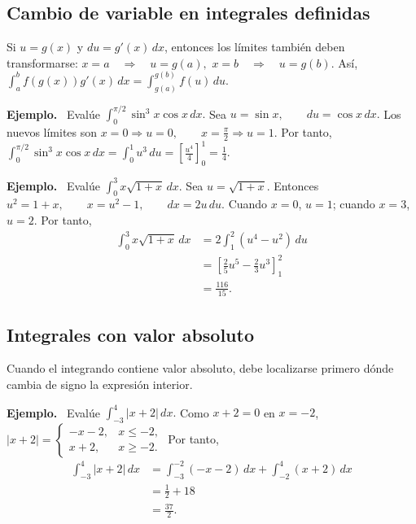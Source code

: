 \documentclass[12pt]{article}
\newenvironment{Ejem}
{\par\medskip\noindent\textbf{Ejemplo.}\ }
{\par\medskip}
\begin{document}
\subsection*{Cambio de variable en integrales definidas}
Si $u=g(x)$ y $du=g'(x)\,dx$, entonces los límites también deben transformarse:
$
x=a\quad\Longrightarrow\quad u=g(a),
$
$
x=b\quad\Longrightarrow\quad u=g(b).
$
Así,
$
\boxed{
\int_a^b f(g(x))g'(x)\,dx
=
\int_{g(a)}^{g(b)}f(u)\,du.
}
$

\begin{Ejem}
Evalúe
$
\int_0^{\pi/2}\sin^3x\cos x\,dx.
$
Sea
$
u=\sin x,
\qquad
du=\cos x\,dx.
$
Los nuevos límites son
$
x=0\Rightarrow u=0,
\qquad
x=\frac{\pi}{2}\Rightarrow u=1.
$
Por tanto,
$
\int_0^{\pi/2}\sin^3x\cos x\,dx
=
\int_0^1u^3\,du
=
\left[\frac{u^4}{4}\right]_0^1
=
\boxed{\frac14}.
$
\end{Ejem}

\begin{Ejem}
Evalúe
$
\int_0^3x\sqrt{1+x}\,dx.
$
Sea
$
u=\sqrt{1+x}.
$
Entonces
$
u^2=1+x,\qquad x=u^2-1,\qquad dx=2u\,du.
$
Cuando $x=0$, $u=1$; cuando $x=3$, $u=2$. Por tanto,
\begin{align*}
\int_0^3x\sqrt{1+x}\,dx
&=
2\int_1^2(u^4-u^2)\,du\\
&=
\left[\frac25u^5-\frac23u^3\right]_1^2\\
&=
\boxed{\frac{116}{15}}.
\end{align*}
\end{Ejem}
\subsection*{Integrales con valor absoluto}
Cuando el integrando contiene valor absoluto, debe localizarse primero dónde
cambia de signo la expresión interior.

\begin{Ejem}
Evalúe
$
\int_{-3}^{4}|x+2|\,dx.
$
Como $x+2=0$ en $x=-2$,
$
|x+2|=
\begin{cases}
-x-2,&x\le-2,\\
x+2,&x\ge-2.
\end{cases}
$
Por tanto,
\begin{align*}
\int_{-3}^{4}|x+2|\,dx
&=
\int_{-3}^{-2}(-x-2)\,dx
+
\int_{-2}^{4}(x+2)\,dx\\
&=
\frac12+18\\
&=
\boxed{\frac{37}{2}}.
\end{align*}
\end{Ejem}
\end{document}
